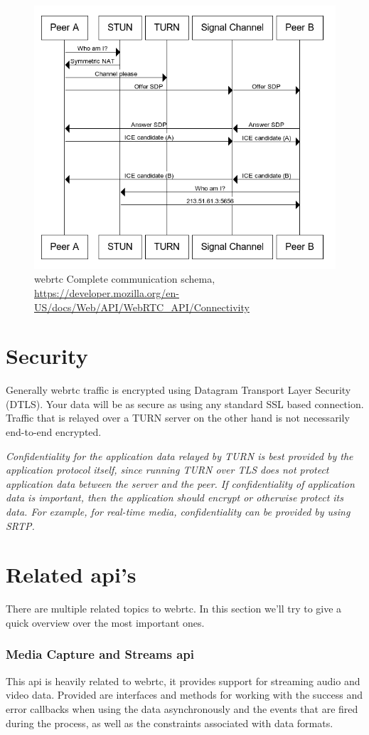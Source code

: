 \begin{figure}[H]
	\includegraphics[scale=0.5]{images/webrtc-complete-diagram.png}
	\centering
	\caption{\Gls{webrtc} Complete communication schema, \url{https://developer.mozilla.org/en-US/docs/Web/API/WebRTC_API/Connectivity}}
	\label{fig:WebRTC}
\end{figure}

\section{Security}
Generally \Gls{webrtc} traffic is encrypted using Datagram Transport Layer Security (DTLS). Your data will be as secure as using any standard SSL based connection. Traffic that is relayed over a TURN server on the other hand is not necessarily end-to-end encrypted.

\textit{Confidentiality for the application data relayed by TURN is best provided by the application protocol itself, since running TURN over TLS does not protect application data between the server and the peer. If confidentiality of application data is important, then the application should encrypt or otherwise protect its data. For example, for real-time media, confidentiality can be provided by using SRTP.}~\cite{TURN:sec}

\section{Related \Gls{api}'s}
There are multiple related topics to \Gls{webrtc}. In this section we'll try to give a quick overview over the most important ones.

\subsubsection{Media Capture and Streams \Gls{api}}
This \Gls{api} is heavily related to \Gls{webrtc}, it provides support for streaming audio and video data. Provided are interfaces and methods for working with the success and error callbacks when using the data asynchronously and the events that are fired during the process, as well as the constraints associated with data formats.